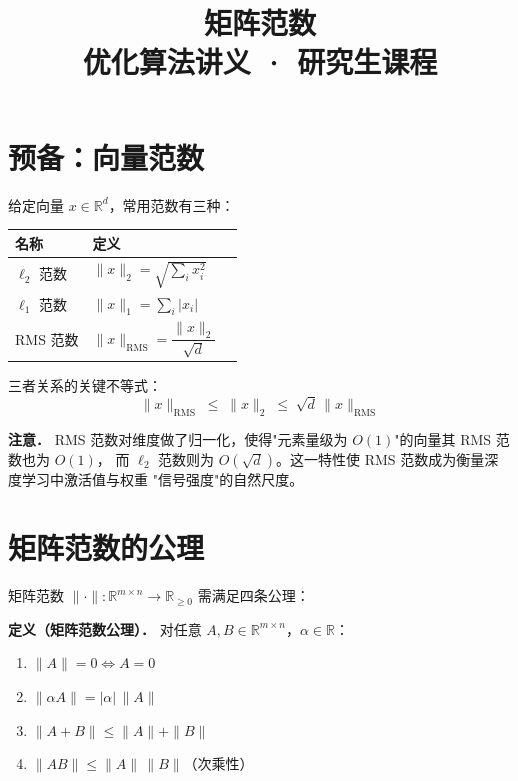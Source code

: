 \documentclass[12pt, a4paper]{article}
\title{\textbf{矩阵范数}\\[0.5em]
  \large 优化算法讲义 · 研究生课程}
\date{}
\newcommand{\RMS}{\mathrm{RMS}}
\begin{document}
\maketitle
\tableofcontents
\newpage

\section{预备：向量范数}

给定向量 $x \in \mathbb{R}^d$，常用范数有三种：

\begin{center}
\begin{tabular}{lll}
\toprule
名称 & 定义 \\
\midrule
$\ell_2$ 范数 & $\|x\|_2 = \sqrt{\sum_i x_i^2}$ \\[6pt]
$\ell_1$ 范数 & $\|x\|_1 = \sum_i |x_i|$ \\[6pt]
RMS 范数      & $\|x\|_{\RMS} = \dfrac{\|x\|_2}{\sqrt{d}}$ \\
\bottomrule
\end{tabular}
\end{center}

三者关系的关键不等式：
\[
  \|x\|_{\RMS} \;\leq\; \|x\|_2 \;\leq\; \sqrt{d}\,\|x\|_{\RMS}
\]

\begin{rembox}
\textbf{注意．} RMS 范数对维度做了归一化，使得"元素量级为 $O(1)$"的向量其 RMS 范数也为 $O(1)$，
而 $\ell_2$ 范数则为 $O(\sqrt{d})$。这一特性使 RMS 范数成为衡量深度学习中激活值与权重
"信号强度"的自然尺度。
\end{rembox}

\section{矩阵范数的公理}

矩阵范数 $\|\cdot\|: \mathbb{R}^{m\times n} \to \mathbb{R}_{\geq 0}$ 需满足四条公理：

\begin{defbox}
\textbf{定义（矩阵范数公理）．} 对任意 $A, B \in \mathbb{R}^{m\times n}$，$\alpha \in \mathbb{R}$：
\begin{enumerate}
  \item[(i)]   $\|A\| = 0 \iff A = 0$
  \item[(ii)]  $\|\alpha A\| = |\alpha|\,\|A\|$
  \item[(iii)] $\|A + B\| \leq \|A\| + \|B\|$
  \item[(iv)]  $\|AB\| \leq \|A\|\,\|B\|$\quad（次乘性）
\end{enumerate}
\end{defbox}
\end{document}
